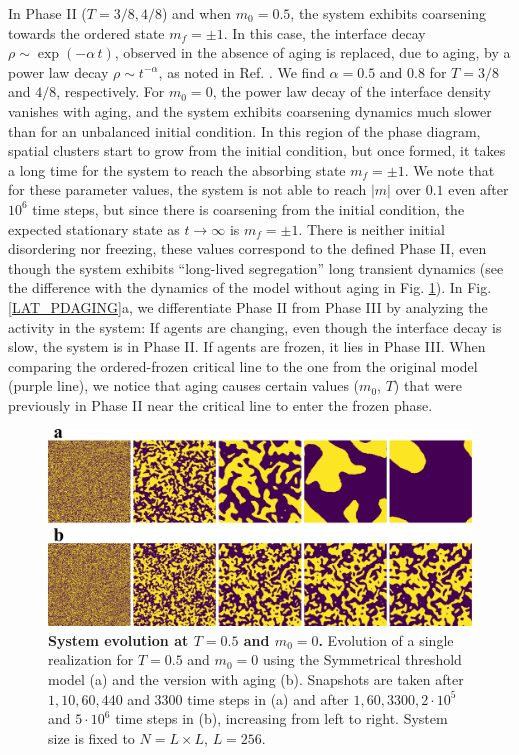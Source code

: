 	In Phase II ($T=3/8, 4/8$) and when $m_0=0.5$, the system exhibits coarsening towards the ordered state $m_f=\pm 1$. In this case, the interface decay $\rho \sim \exp(-\alpha \, t)$, observed in the absence of aging is replaced, due to aging, by a power law decay $\rho \sim t^{-\alpha}$, as noted in Ref. \cite{Abella-2022-AME}. We find $\alpha=0.5$ and $0.8$ for $T=3/8$ and $4/8$, respectively. For $m_0=0$, the power law decay of the interface density vanishes with aging, and the system exhibits coarsening dynamics much slower than for an unbalanced initial condition. In this region of the phase diagram, spatial clusters start to grow from the initial condition, but once formed, it takes a long time for the system to reach the absorbing state $m_f = \pm 1$. 
	We note that for these parameter values, the system is not able to reach $|m|$ over $0.1$ even after $10^6$ time steps, but since there is coarsening from the initial condition, the expected stationary state as $t \to \infty$ is $m_f=\pm1$. There is neither initial disordering nor freezing, these values correspond to the defined Phase II, even though the system exhibits ``long-lived segregation'' long transient dynamics (see the difference with the dynamics of the model without aging in Fig. \ref{fig:snapshots}). In Fig. \ref{LAT_PDAGING}a, we differentiate Phase II from Phase III by analyzing the activity in the system: If agents are changing, even though the interface decay is slow, the system is in Phase II. If agents are frozen, it lies in Phase III. When comparing the ordered-frozen critical line to the one from the original model (purple line), we notice that aging causes certain values ($m_0$, $T$) that were previously in Phase II near the critical line to enter the frozen phase.
	
	\begin{figure}
		 \centering
		 \includegraphics[width=\linewidth]{Figs/Aging_STM/FIG13.pdf}
		 \caption{\label{fig:snapshots} \textbf{System evolution at $T = 0.5$ and $m_0 = 0$.} Evolution of a single realization for $T = 0.5$ and $m_0 = 0$ using the Symmetrical threshold model (a) and the version with aging (b). Snapshots are taken after $1,10,60,440$ and $3300$ time steps in (a) and after $1,60,3300,2 \cdot 10^5$ and $5 \cdot 10^6$ time steps in (b), increasing from left to right. System size is fixed to $N = L \times L$, $L = 256$.}
	\end{figure}
	
